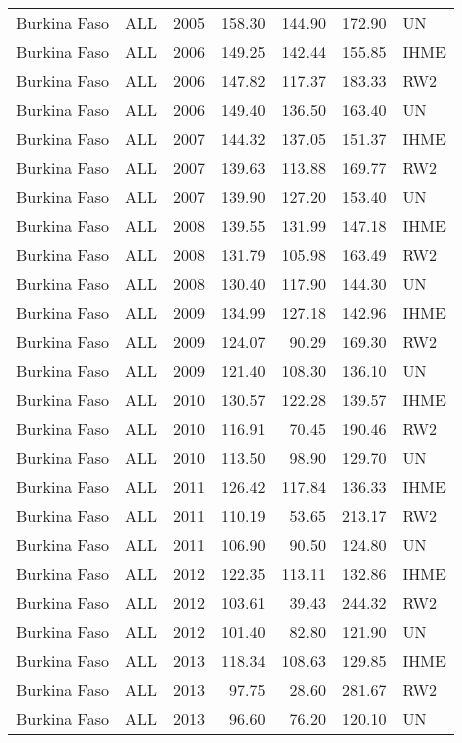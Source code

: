\begin{longtable}{lllrrrl}
  Burkina Faso & ALL & 2005 & 158.30 & 144.90 & 172.90 & UN \\ 
  Burkina Faso & ALL & 2006 & 149.25 & 142.44 & 155.85 & IHME \\ 
  Burkina Faso & ALL & 2006 & 147.82 & 117.37 & 183.33 & RW2 \\ 
  Burkina Faso & ALL & 2006 & 149.40 & 136.50 & 163.40 & UN \\ 
  Burkina Faso & ALL & 2007 & 144.32 & 137.05 & 151.37 & IHME \\ 
  Burkina Faso & ALL & 2007 & 139.63 & 113.88 & 169.77 & RW2 \\ 
  Burkina Faso & ALL & 2007 & 139.90 & 127.20 & 153.40 & UN \\ 
  Burkina Faso & ALL & 2008 & 139.55 & 131.99 & 147.18 & IHME \\ 
  Burkina Faso & ALL & 2008 & 131.79 & 105.98 & 163.49 & RW2 \\ 
  Burkina Faso & ALL & 2008 & 130.40 & 117.90 & 144.30 & UN \\ 
  Burkina Faso & ALL & 2009 & 134.99 & 127.18 & 142.96 & IHME \\ 
  Burkina Faso & ALL & 2009 & 124.07 & 90.29 & 169.30 & RW2 \\ 
  Burkina Faso & ALL & 2009 & 121.40 & 108.30 & 136.10 & UN \\ 
  Burkina Faso & ALL & 2010 & 130.57 & 122.28 & 139.57 & IHME \\ 
  Burkina Faso & ALL & 2010 & 116.91 & 70.45 & 190.46 & RW2 \\ 
  Burkina Faso & ALL & 2010 & 113.50 & 98.90 & 129.70 & UN \\ 
  Burkina Faso & ALL & 2011 & 126.42 & 117.84 & 136.33 & IHME \\ 
  Burkina Faso & ALL & 2011 & 110.19 & 53.65 & 213.17 & RW2 \\ 
  Burkina Faso & ALL & 2011 & 106.90 & 90.50 & 124.80 & UN \\ 
  Burkina Faso & ALL & 2012 & 122.35 & 113.11 & 132.86 & IHME \\ 
  Burkina Faso & ALL & 2012 & 103.61 & 39.43 & 244.32 & RW2 \\ 
  Burkina Faso & ALL & 2012 & 101.40 & 82.80 & 121.90 & UN \\ 
  Burkina Faso & ALL & 2013 & 118.34 & 108.63 & 129.85 & IHME \\ 
  Burkina Faso & ALL & 2013 & 97.75 & 28.60 & 281.67 & RW2 \\ 
  Burkina Faso & ALL & 2013 & 96.60 & 76.20 & 120.10 & UN \\ 

\end{longtable}
